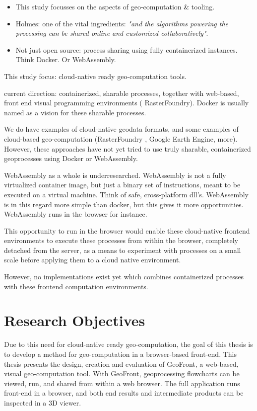 \begin{itemize}
  \item This study focusses on the aspects of geo-computation \& tooling.
  \item Holmes: one of the vital ingredients: \emph{"and the algorithms powering the processing can be shared online and customized collaboratively"}.
  \item Not just open source: process sharing using fully containerized instances. Think Docker. Or WebAssembly.
\end{itemize}

\m{->} This study focus: cloud-native ready geo-computation tools. 

\m{->} current direction: containerized, sharable processes, together with web-based, front end visual programming environments ( RasterFoundry). Docker is usually named as a vision for these sharable processes.

\m{->} We do have examples of cloud-native geodata formats, and some examples of cloud-based geo-computation (RasterFoundry , Google Earth Engine, more). However, these approaches have not yet tried to use truly sharable, containerized geoprocesses using Docker or WebAssembly. 

\m{->} WebAssembly as a whole is underresearched. WebAssembly is not a fully virtualized container image, but just a binary set of instructions, meant to be executed on a virtual machine. Think of safe, cross-platform dll's. 
WebAssembly is in this regard more simple than docker, but this gives it more opportunities. 
WebAssembly runs in the browser for instance. 

\m{->} This opportunity to run in the browser would enable these cloud-native frontend environments to execute these processes from within the browser, completely detached from the server, as a means to experiment with processes on a small scale before applying them to a cloud native environment. 

\m{->} However, no implementations exist yet which combines containerized processes with these frontend computation environments. 


\section{Research Objectives}
Due to this need for cloud-native ready geo-computation, the goal of this thesis is to develop a method for geo-computation in a browser-based front-end. 
This thesis presents the design, creation and evaluation of GeoFront, a web-based, visual geo-computation tool. 
With GeoFront, geoprocessing flowcharts can be viewed, run, and shared from within a web browser.  
The full application runs front-end in a browser, and both end results and intermediate products can be inspected in a 3D viewer.

